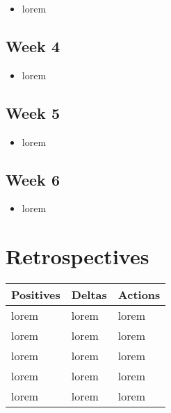 \documentclass[10pt, onecolumn, draftclsnofoot, letterpaper, compsoc]{IEEEtran}
\begin{document}
    \begin{itemize}

    \item lorem

    \end{itemize}

\subsection{Week 4}

    \begin{itemize}

    \item lorem

    \end{itemize}

\subsection{Week 5}

    \begin{itemize}

    \item lorem

    \end{itemize}

\subsection{Week 6}

    \begin{itemize}

    \item lorem

    \end{itemize}

\section{Retrospectives}

\begin{table}[h]
    \centering
    \begin{tabular}{|p{.3\linewidth}|p{.3\linewidth}|p{.3\linewidth}|}

    \cline{3-3}

    \hline \textbf{Positives} & \textbf{Deltas} & \textbf{Actions} \\ \hline

    lorem & lorem & lorem \\ \hline
    lorem & lorem & lorem \\ \hline
    lorem & lorem & lorem \\ \hline
    lorem & lorem & lorem \\ \hline
    lorem & lorem & lorem \\ \hline

    \end{tabular}
\end{table}
\end{document}
